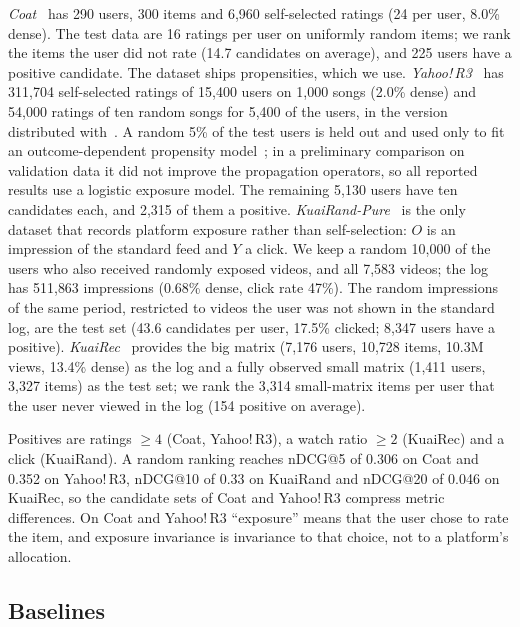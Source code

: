 \documentclass[preprint,review,12pt,authoryear]{elsarticle}
\theoremstyle{definition}
\begin{document}
\emph{Coat}~\citep{schnabel2016} has 290 users, 300 items and 6{,}960
self-selected ratings (24 per user, 8.0\% dense). The test data are 16 ratings per
user on uniformly random items; we rank the items the user did not rate (14.7
candidates on average), and 225 users have a positive candidate. The dataset
ships propensities, which we use.
\emph{Yahoo!\,R3}~\citep{marlin2009collaborative} has 311{,}704 self-selected
ratings of 15{,}400 users on 1{,}000 songs (2.0\% dense) and 54{,}000 ratings of
ten random songs for 5{,}400 of the users, in the version distributed
with~\citep{chen2021autodebias}. A random 5\% of the test users is held out and
used only to fit an outcome-dependent propensity model~\citep{schnabel2016}; in a
preliminary comparison on validation data it did not improve the propagation
operators, so all reported results use a logistic exposure model. The remaining 5{,}130 users have ten
candidates each, and 2{,}315 of them a positive.
\emph{KuaiRand-Pure}~\citep{gao2022kuairand} is the only dataset that records
platform exposure rather than self-selection: $O$ is an impression of the
standard feed and $Y$ a click. We keep a random 10{,}000 of the users who also
received randomly exposed videos, and all 7{,}583 videos; the log has 511{,}863
impressions (0.68\% dense, click rate 47\%). The random impressions of the same
period, restricted to videos the user was not shown in the standard log, are the
test set (43.6 candidates per user, 17.5\% clicked; 8{,}347 users have a
positive). \emph{KuaiRec}~\citep{gao2022kuairec} provides the big matrix (7{,}176
users, 10{,}728 items, 10.3M views, 13.4\% dense) as the log and a fully observed
small matrix (1{,}411 users, 3{,}327 items) as the test set; we rank the 3{,}314
small-matrix items per user that the user never viewed in the log (154 positive
on average).

Positives are ratings $\ge4$ (Coat, Yahoo!\,R3), a watch ratio $\ge2$ (KuaiRec)
and a click (KuaiRand). A random ranking reaches nDCG@5 of 0.306 on Coat and
0.352 on Yahoo!\,R3, nDCG@10 of 0.33 on KuaiRand and nDCG@20 of 0.046 on
KuaiRec, so the candidate sets of Coat and Yahoo!\,R3 compress metric differences.
On Coat and Yahoo!\,R3 ``exposure'' means that the user chose to rate the item,
and exposure invariance is invariance to that choice, not to a platform's
allocation.

\subsection{Baselines}\label{sec:baselines}
\end{document}
